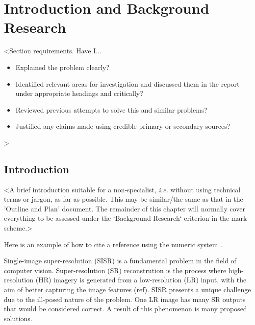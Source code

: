 \chapter{Introduction and Background Research}

\label{chapter1}

<Section requirements. Have I...
\begin{itemize}
    \item Explained the problem clearly?
    \item Identified relevant areas for investigation and discussed them in the report under appropriate headings and critically?
    \item Reviewed previous attempts to solve this and similar problems?
    \item Justified any claims made using credible primary or secondary sources?
\end{itemize}
>

\section{Introduction}

<A brief introduction suitable for a non-specialist, {\em i.e.} without using technical terms or jargon, as far as possible. This may be similar/the same as that in the 'Outline and Plan' document. The remainder of this chapter will normally cover everything to be assessed under the `Background Research` criterion in the mark scheme.>

Here is an example of how to cite a reference using the numeric system \cite{parikh1980adaptive}.

Single-image super-resolution (SISR) is a fundamental problem in the field of computer vision. Super-resolution (SR) reconstrution is the process where high-resolution (HR) imagery is generated from a low-resolution (LR) input, with the aim of better capturing the image features (ref). SISR presents a unique challenge due to the ill-posed nature of the problem. One LR image has many SR outputs that would be considered correct. A result of this phenomenon is many proposed solutions. 

